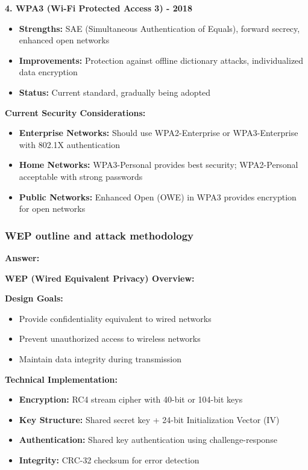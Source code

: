 \documentclass[12pt,a4paper]{article}
\begin{document}
\textbf{4. WPA3 (Wi-Fi Protected Access 3) - 2018}
\begin{itemize}
    \item \textbf{Strengths:} SAE (Simultaneous Authentication of Equals), forward secrecy, enhanced open networks
    \item \textbf{Improvements:} Protection against offline dictionary attacks, individualized data encryption
    \item \textbf{Status:} Current standard, gradually being adopted
\end{itemize}

\textbf{Current Security Considerations:}
\begin{itemize}
    \item \textbf{Enterprise Networks:} Should use WPA2-Enterprise or WPA3-Enterprise with 802.1X authentication
    \item \textbf{Home Networks:} WPA3-Personal provides best security; WPA2-Personal acceptable with strong passwords
    \item \textbf{Public Networks:} Enhanced Open (OWE) in WPA3 provides encryption for open networks
\end{itemize}

\subsubsection{WEP outline and attack methodology}

\textbf{Answer:}

\textbf{WEP (Wired Equivalent Privacy) Overview:}

\textbf{Design Goals:}
\begin{itemize}
    \item Provide confidentiality equivalent to wired networks
    \item Prevent unauthorized access to wireless networks
    \item Maintain data integrity during transmission
\end{itemize}

\textbf{Technical Implementation:}
\begin{itemize}
    \item \textbf{Encryption:} RC4 stream cipher with 40-bit or 104-bit keys
    \item \textbf{Key Structure:} Shared secret key + 24-bit Initialization Vector (IV)
    \item \textbf{Authentication:} Shared key authentication using challenge-response
    \item \textbf{Integrity:} CRC-32 checksum for error detection
\end{itemize}
\end{document}
